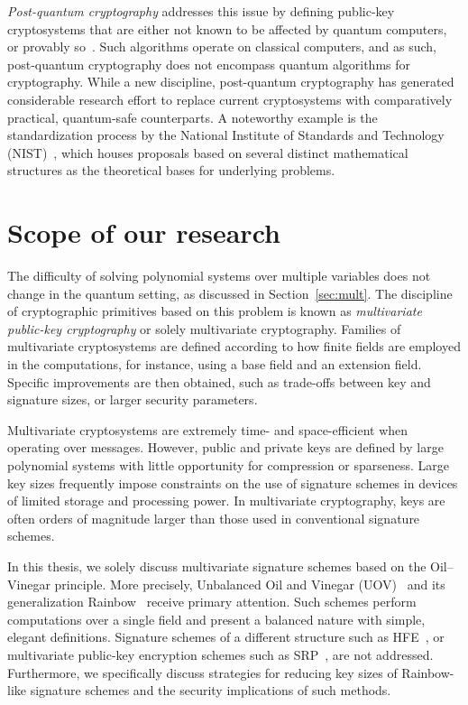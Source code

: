 \documentclass[12pt, a4paper, oneside]{memoir}
\theoremstyle{definition}
\begin{document}
\emph{Post-quantum cryptography} addresses this issue by defining public-key cryptosystems that are either not known to be affected by quantum computers, or provably so~\cite{Bernstein:2008}. Such algorithms operate on classical computers, and as such, post-quantum cryptography does not encompass quantum algorithms for cryptography. While a new discipline, post-quantum cryptography has generated considerable research effort to replace current cryptosystems with comparatively practical, quantum-safe counterparts. A noteworthy example is the standardization process by the National Institute of Standards and Technology (NIST)~\cite{Alagic:201901,Alagic:202007}, which houses proposals based on several distinct mathematical structures as the theoretical bases for underlying problems.

\section{Scope of our research}

The difficulty of solving polynomial systems over multiple variables does not change in the quantum setting, as discussed in Section~\ref{sec:mult}. The discipline of cryptographic primitives based on this problem is known as \textit{multivariate public-key cryptography} or solely multivariate cryptography. Families of multivariate cryptosystems are defined according to how finite fields are employed in the computations, for instance, using a base field and an extension field. Specific improvements are then obtained, such as trade-offs between key and signature sizes, or larger security parameters.

Multivariate cryptosystems are extremely time- and space-efficient when operating over messages. However, public and private keys are defined by large polynomial systems with little opportunity for compression or sparseness. Large key sizes frequently impose constraints on the use of signature schemes in devices of limited storage and processing power. In multivariate cryptography, keys are often orders of magnitude larger than those used in conventional signature schemes.

In this thesis, we solely discuss multivariate signature schemes based on the Oil--Vinegar principle. More precisely, Unbalanced Oil and Vinegar (UOV)~\cite{Kipnis:199904} and its generalization Rainbow~\cite{Ding:200506} receive primary attention. Such schemes perform computations over a single field and present a balanced nature with simple, elegant definitions. Signature schemes of a different structure such as HFE~\cite{Patarin:199605}, or multivariate public-key encryption schemes such as SRP~\cite{Duong:201607}, are not addressed. Furthermore, we specifically discuss strategies for reducing key sizes of Rainbow-like signature schemes and the security implications of such methods.
\end{document}
